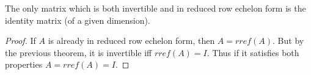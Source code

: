 \documentclass{ximera}
\begin{document}
\begin{corollary} The only matrix which is both invertible and in reduced row echelon form is the identity matrix (of a given dimension).
\end{corollary}

\begin{proof} If $A$ is already in reduced row echelon form, then $A = rref(A)$. But by the previous theorem, it is invertible iff $rref(A) = I$. Thus if it satisfies both properties $A = rref(A) = I$.
\end{proof}
\end{document}
